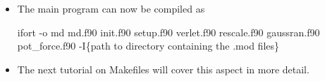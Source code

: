 \documentclass[slidestop,mathserif,compress,xcolor=svgnames]{beamer}
\begin{document}
\begin{frame}[allowframebreaks]
\begin{itemize}
\begin{block}{}
      {\tiny
        ifort -c precision.f90 param.f90 lennjones.f90 \\
        creates precision.mod param.mod lennjones.mod
        }
    \end{block}
    \item The main program can now be compiled as
    \begin{block}{}
      {\tiny
        ifort -o md md.f90 init.f90 setup.f90 verlet.f90 rescale.f90 gaussran.f90 pot\_force.f90 -I\{path to directory containing the .mod files\}
      }
    \end{block}
    \item The next tutorial on Makefiles will cover this aspect in more detail.
  \end{itemize}
\end{frame}
\end{document}
